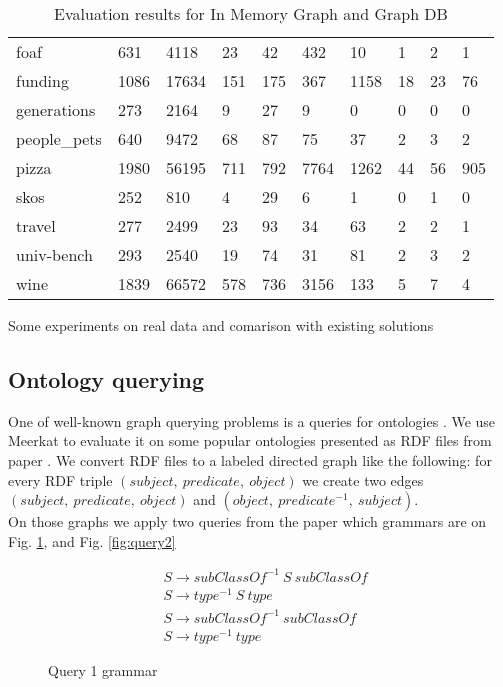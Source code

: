\begin{table*}[t]
\begin{tabular}{|l|l|llll|llll|}
foaf                        & 631  & 4118  & 23  & 42  & 432  & 10   & 1  & 2  & 1    \\
funding                     & 1086 & 17634 & 151 & 175 & 367  & 1158 & 18 & 23 & 76   \\
generations                 & 273  & 2164  & 9   & 27  & 9    & 0    & 0  & 0  & 0    \\
people\_pets                & 640  & 9472  & 68  & 87  & 75   & 37   & 2  & 3  & 2    \\
pizza                       & 1980 & 56195 & 711 & 792 & 7764 & 1262 & 44 & 56 & 905  \\
skos                        & 252  & 810   & 4   & 29  & 6    & 1    & 0  & 1  & 0    \\
travel                      & 277  & 2499  & 23  & 93  & 34   & 63   & 2  & 2  & 1    \\
univ-bench                  & 293  & 2540  & 19  & 74  & 31   & 81   & 2  & 3  & 2    \\
wine                        & 1839 & 66572 & 578 & 736 & 3156 & 133  & 5  & 7  & 4    \\
\hline
\end{tabular}
\caption{Evaluation results for In Memory Graph and Graph DB}
\label{table:rdfs}
\end{table*}

Some experiments on real data and comarison with existing solutions

\subsection{Ontology querying}
\label{sec:ontology}

One of well-known graph querying problems is a queries for ontologies \cite{FndDB}. We use Meerkat to evaluate
it on some popular ontologies presented as RDF files from paper \cite{CFGonRDF}. We convert RDF files to a labeled directed graph like the following: for every RDF triple $(subject,\ predicate,\ object)$ we create two edges $(subject,\ predicate,\ object)$ and $(object,\ predicate^{-1},\ subject)$.\\
On those graphs we apply two queries from the paper \cite{GrigorevR16} which grammars are on Fig. \ref{fig:query1}, and Fig.  \ref{fig:query2} 
\begin{figure}[h]
\begin{align*}
& S \rightarrow subClassOf^{-1}\ S\ subClassOf\\
& S \rightarrow type^{-1}\ S\ type\\
& S \rightarrow subClassOf^{-1}\ subClassOf\\
& S \rightarrow type^{-1}\ type
\end{align*}
\caption{Query 1 grammar}
\label{fig:query1}
\end{figure}

